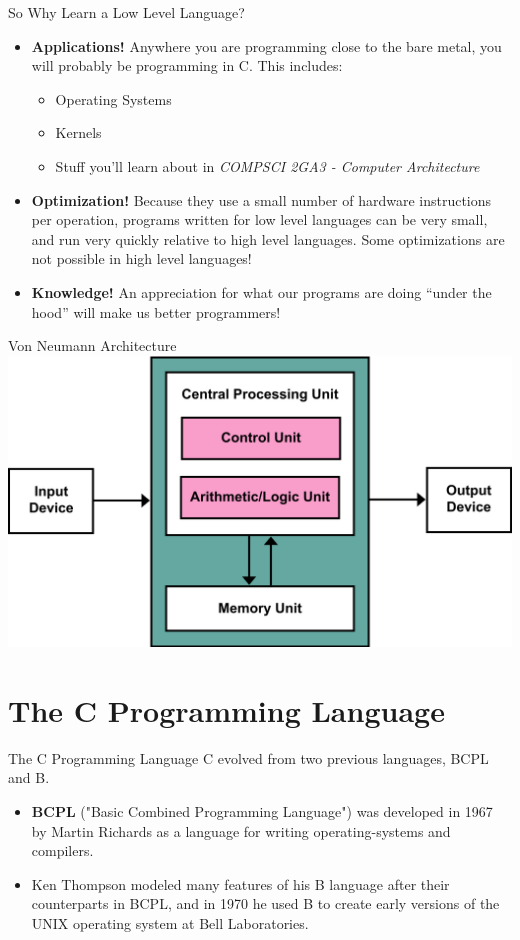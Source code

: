 \documentclass[11pt]{beamer}
\begin{document}
\begin{frame}{So Why Learn a Low Level Language?}
\begin{itemize}
\item \textbf{Applications!} Anywhere you are programming close to the bare metal, you will probably be programming in C.  This includes:
\begin{itemize}
\item Operating Systems 
\item Kernels
\item Stuff you'll learn about in \emph{COMPSCI 2GA3 - Computer Architecture}
\end{itemize}
\item \textbf{Optimization!} Because they use a small number of hardware instructions per operation, programs written for low level languages can be very small, and run very quickly relative to high level languages.  Some optimizations are not possible in high level languages! 
\item \textbf{Knowledge!}  An appreciation for what our programs are doing ``under the hood'' will make us better programmers!  
\end{itemize}
\end{frame}

\begin{frame}{Von Neumann Architecture}
\center
\includegraphics[scale=0.2]{VonNeumann.png}
\end{frame}

\section[C]{The C Programming Language}


\begin{frame}{The C Programming Language}
C evolved from two previous languages, BCPL and B.
\begin{itemize}
\item \textbf{BCPL} ("Basic Combined Programming Language") was developed in 1967 by Martin Richards as a language for writing operating-systems and compilers.
\item Ken Thompson modeled many features of his B language after their counterparts in BCPL, and in 1970 he used B to create early versions of the UNIX operating system at Bell Laboratories.
\end{itemize}
\end{frame}
\end{document}
